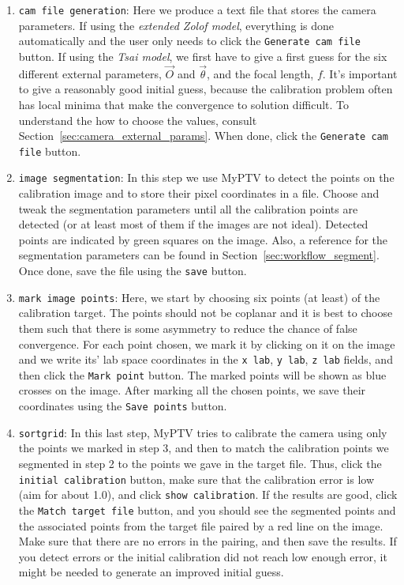 \documentclass[10pt,a4paper]{article}
\begin{document}
\begin{enumerate}
	\item \texttt{cam file generation}: Here we produce a text file that stores the camera parameters. If using the \textit{extended Zolof model}, everything is done automatically and the user only needs to click the \texttt{Generate cam file} button. If using the \textit{Tsai model}, we first have to give a first guess for the six different external parameters, $\vec{O}$ and $\vec{\theta}$, and the focal length, $f$. It's important to give a reasonably good initial guess, because the calibration problem often has local minima that make the convergence to solution difficult. To understand the how to choose the values, consult Section~\ref{sec:camera_external_params}. When done, click the \texttt{Generate cam file} button.  
	
	\item \texttt{image segmentation}: In this step we use MyPTV to detect the points on the calibration image and to store their pixel coordinates in a file. Choose and tweak the segmentation parameters until all the calibration points are detected (or at least most of them if the images are not ideal). Detected points are indicated by green squares on the image. Also, a reference for the segmentation parameters can be found in Section~\ref{sec:workflow_segment}. Once done, save the file using the \texttt{save} button.
	
	\item \texttt{mark image points}: Here, we start by choosing six points (at least) of the calibration target. The points should not be coplanar and it is best to choose them such that there is some asymmetry to reduce the chance of false convergence. For each point chosen, we mark it by clicking on it on the image and we write its' lab space coordinates in the \texttt{x lab}, \texttt{y lab}, \texttt{z lab} fields, and then click the \texttt{Mark point} button. The marked points will be shown as blue crosses on the image. After marking all the chosen points, we save their coordinates using the \texttt{Save points} button.
	
	\item \texttt{sortgrid}: In this last step, MyPTV tries to calibrate the camera using only the points we marked in step 3, and then to match the calibration points we segmented in step 2 to the points we gave in the target file. Thus, click the \texttt{initial calibration} button, make sure that the calibration error is low (aim for about 1.0), and click \texttt{show calibration}. If the results are good, click the \texttt{Match target file} button, and you should see the segmented points and the associated points from the target file paired by a red line on the image. Make sure that there are no errors in the pairing, and then save the results. If you detect errors or the initial calibration did not reach low enough error, it might be needed to generate an improved initial guess.  
		 
\end{enumerate}
 
\end{document}
